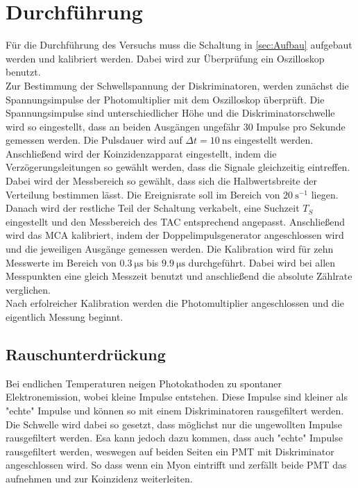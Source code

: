 \section{Durchführung}
\label{sec:Durchführung}
Für die Durchführung des Versuchs muss die Schaltung in \autoref{sec:Aufbau} aufgebaut werden und kalibriert werden.
Dabei wird zur Überprüfung ein Oszilloskop benutzt.\\
Zur Bestimmung der Schwellspannung der Diskriminatoren, werden zunächst die Spannungsimpulse der Photomultiplier mit dem Oszilloskop überprüft.
Die Spannungsimpulse sind unterschiedlicher Höhe und die Diskriminatorschwelle wird so eingestellt, dass an beiden Ausgängen ungefähr $30$ Impulse pro Sekunde gemessen werden.
Die Pulsdauer wird auf $\Delta t = \qty{10}{\nano\second}$ eingestellt werden.\\
Anschließend wird der Koinzidenzapparat eingestellt, indem die Verzögerungsleitungen so gewählt werden, dass die Signale gleichzeitig eintreffen. Dabei wird der Messbereich so gewählt,
dass sich die Halbwertsbreite der Verteilung bestimmen lässt. Die Ereignisrate soll im Bereich von $\qty{20}{\second^{-1}}$ liegen.\\
Danach wird der restliche Teil der Schaltung verkabelt, eine Suchzeit $T_S$ eingestellt und den Messbereich des TAC entsprechend angepasst.
Anschließend wird das MCA kalibriert, indem der Doppelimpulsgenerator angeschlossen wird und die jeweiligen Ausgänge gemessen werden. Die Kalibration wird für zehn Messwerte im Bereich von
$\qty{0.3}{\micro\second}$ bis  $\qty{9.9}{\micro\second}$ durchgeführt. Dabei wird bei allen Messpunkten eine gleich Messzeit benutzt und anschließend die absolute Zählrate verglichen.\\
Nach erfolreicher Kalibration werden die Photomultiplier angeschlossen und die eigentlich Messung beginnt.

\subsection{Rauschunterdrückung}
\label{subsec:Rauschunterdrückung}
Bei endlichen Temperaturen neigen Photokathoden zu spontaner Elektronemission, wobei kleine Impulse entstehen.
Diese Impulse sind kleiner als "echte" Impulse und können so mit einem Diskriminatoren rausgefiltert werden. Die Schwelle wird
dabei so gesetzt, dass möglichst nur die ungewollten Impulse rausgefiltert werden. Esa kann jedoch dazu kommen, dass auch "echte"
Impulse rausgefiltert werden, weswegen auf beiden Seiten ein PMT mit Diskriminator angeschlossen wird. 
So dass wenn ein Myon eintrifft und zerfällt beide PMT das aufnehmen und zur Koinzidenz weiterleiten.

